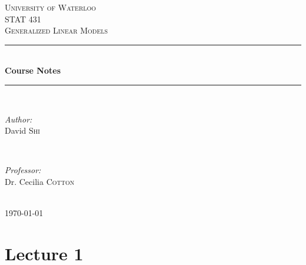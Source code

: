 \documentclass[english,12pt]{article}
\theoremstyle{plain}
\theoremstyle{definition}
\theoremstyle{definition} %
\begin{document}
\begin{titlepage}

\newcommand{\HRule}{\rule{\linewidth}{0.5mm}} %

\center %

\textsc{\LARGE University of Waterloo}\\[1.5cm] %
\textsc{\Large STAT 431}\\[0.5cm] %
\textsc{\large Generalized Linear Models}\\[0.5cm] %

\HRule \\[0.4cm]
{ \huge \bfseries Course Notes}\\[0.4cm] %
\HRule \\[1.5cm]

\begin{minipage}{0.4\textwidth}
\begin{flushleft} \large
\emph{Author:}\\
David \textsc{Shi} %
\end{flushleft}
\end{minipage}
~
\begin{minipage}{0.4\textwidth}
\begin{flushright} \large
\emph{Professor:} \\
Dr. Cecilia \textsc{Cotton} %
\end{flushright}
\end{minipage}\\[4cm]

{\large \today}\\[3cm] %


\vfill %

\end{titlepage}

\tableofcontents %

\newpage


\section*{Lecture 1}
\end{document}
